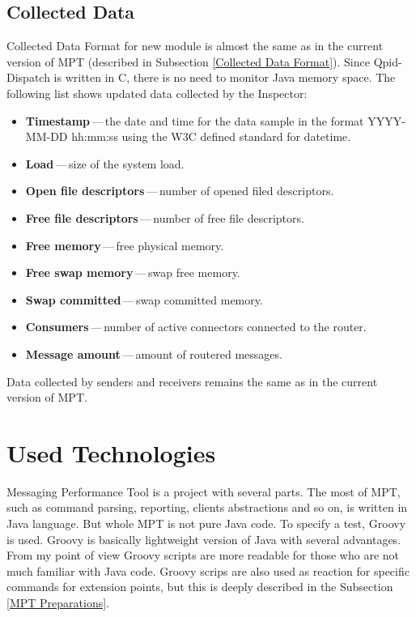 \subsection{Collected Data}
\label{Collected Data}
Collected Data Format for new module is almost the same as in the current version of MPT (described in Subsection \ref{Collected Data Format}). Since Qpid-Dispatch is written in C, there is no need to monitor Java memory space. The following list shows updated data collected by the Inspector:

\begin{itemize}
	\setlength\itemsep{0em}
	\item \textbf{Timestamp}\,---\,the date and time for the data sample in the format YYYY-MM-DD hh:mm:ss using the W3C defined standard for datetime.
	\item \textbf{Load}\,---\,size of the system load.
	\item \textbf{Open file descriptors}\,---\,number of opened filed descriptors.
	\item \textbf{Free file descriptors}\,---\,number of free file descriptors.
	\item \textbf{Free memory}\,---\,free physical memory.
	\item \textbf{Free swap memory}\,---\,swap free memory.
	\item \textbf{Swap committed}\,---\,swap committed memory.
	\item \textbf{Consumers}\,---\,number of active connectors connected to the router.
	\item \textbf{Message amount}\,---\,amount of routered messages.
\end{itemize}
Data collected by senders and receivers remains the same as in the current version of MPT.

\section{Used Technologies}
Messaging Performance Tool is a project with several parts. The most of MPT, such as command parsing, reporting, clients abstractions and so on, is written in Java language. But whole MPT is not pure Java code. To specify a test, Groovy is used. Groovy is basically lightweight version of Java with several advantages. From my point of view Groovy scripts are more readable for those who are not much familiar with Java code. Groovy scrips are also used as reaction for specific commands for extension points, but this is deeply described in the Subsection \ref{MPT Preparations}.

